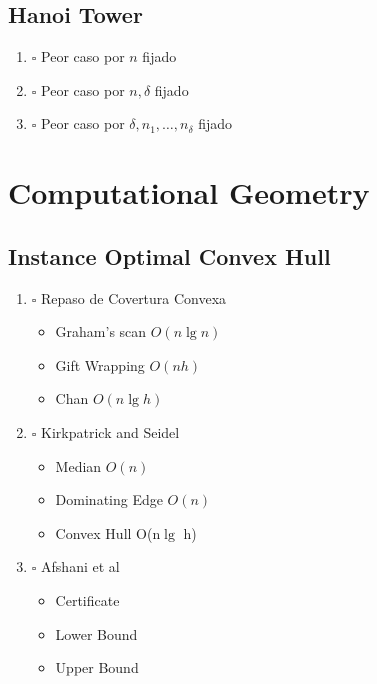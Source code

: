 \documentclass{beamer}
\begin{document}
\subsection{Hanoi Tower}
\label{sec-1-1}
\begin{frame}
\begin{enumerate}
\item $\square$ Peor caso por \(n\) fijado
\item $\square$ Peor caso por \(n,\delta\) fijado
\item $\square$ Peor caso por \(\delta,n_1,\ldots,n_\delta\) fijado
  \end{enumerate}
  \end{frame}

\section{Computational Geometry}
\label{sec-1}


\subsection{Instance Optimal Convex Hull}
\label{sec-1-2}

\begin{frame}
\begin{enumerate}
\item $\square$ Repaso de Covertura Convexa
  \begin{itemize}
\item Graham's scan \(O(n \lg n)\) \cite{1972-IPL-AnEfficientAlgorithmForDeterminingTheConvexHullOfAFinitePlanarSet-Graham}
\item Gift Wrapping \(O(nh)\)
\item Chan \(O(n\lg h)\) \cite{1996-DCG-OutputSensitiveResultsOnConvexHullsExtremePointsAndRelatedProblems-Chan}
  \end{itemize}
\item $\square$ Kirkpatrick and Seidel \cite{1986-JCom-TheUltimatePlanarConvexHullAlgorithm-KirkpatrickSeidel}
  \begin{itemize}
\item Median \(O(n)\)
\item Dominating Edge \(O(n)\)
\item Convex Hull O(n\(\lg\) h)
  \end{itemize}
\item $\square$ Afshani et al \cite{2009-FOCS-InstanceOptimalGeometricAlgorithms-AfshaniBarbayChan}
  \begin{itemize}
\item Certificate
\item Lower Bound
\item Upper Bound
  \end{itemize}
  \end{enumerate}
  \end{frame}
\end{document}
